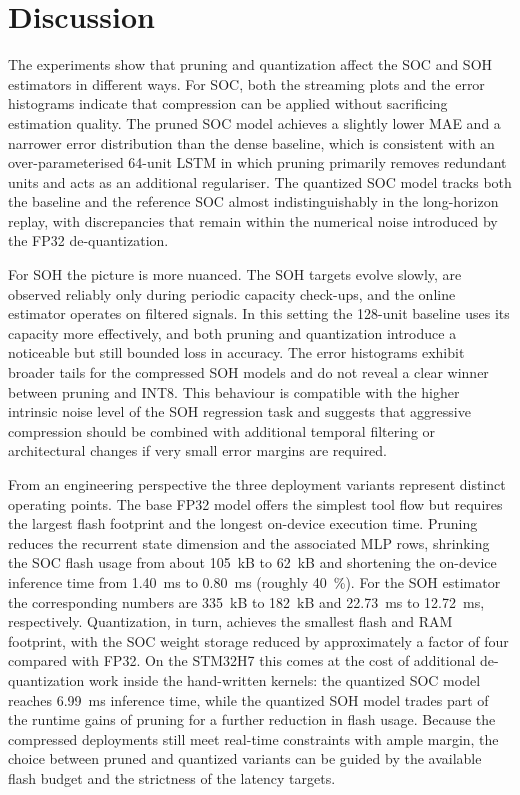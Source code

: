 \documentclass[final,3p,times]{elsarticle}
\begin{document}
\section{Discussion}
The experiments show that pruning and quantization affect the SOC and SOH estimators in different ways. For SOC, both the streaming plots and the error histograms indicate that compression can be applied without sacrificing estimation quality. The pruned SOC model achieves a slightly lower MAE and a narrower error distribution than the dense baseline, which is consistent with an over-parameterised 64-unit LSTM in which pruning primarily removes redundant units and acts as an additional regulariser. The quantized SOC model tracks both the baseline and the reference SOC almost indistinguishably in the long-horizon replay, with discrepancies that remain within the numerical noise introduced by the FP32 de-quantization.

For SOH the picture is more nuanced. The SOH targets evolve slowly, are observed reliably only during periodic capacity check-ups, and the online estimator operates on filtered signals. In this setting the 128-unit baseline uses its capacity more effectively, and both pruning and quantization introduce a noticeable but still bounded loss in accuracy. The error histograms exhibit broader tails for the compressed SOH models and do not reveal a clear winner between pruning and INT8. This behaviour is compatible with the higher intrinsic noise level of the SOH regression task and suggests that aggressive compression should be combined with additional temporal filtering or architectural changes if very small error margins are required.

From an engineering perspective the three deployment variants represent distinct operating points. The base FP32 model offers the simplest tool flow but requires the largest flash footprint and the longest on-device execution time. Pruning reduces the recurrent state dimension and the associated MLP rows, shrinking the SOC flash usage from about 105~kB to 62~kB and shortening the on-device inference time from 1.40~ms to 0.80~ms (roughly 40~\%). For the SOH estimator the corresponding numbers are 335~kB to 182~kB and 22.73~ms to 12.72~ms, respectively. Quantization, in turn, achieves the smallest flash and RAM footprint, with the SOC weight storage reduced by approximately a factor of four compared with FP32. On the STM32H7 this comes at the cost of additional de-quantization work inside the hand-written kernels: the quantized SOC model reaches 6.99~ms inference time, while the quantized SOH model trades part of the runtime gains of pruning for a further reduction in flash usage. Because the compressed deployments still meet real-time constraints with ample margin, the choice between pruned and quantized variants can be guided by the available flash budget and the strictness of the latency targets.
\end{document}
